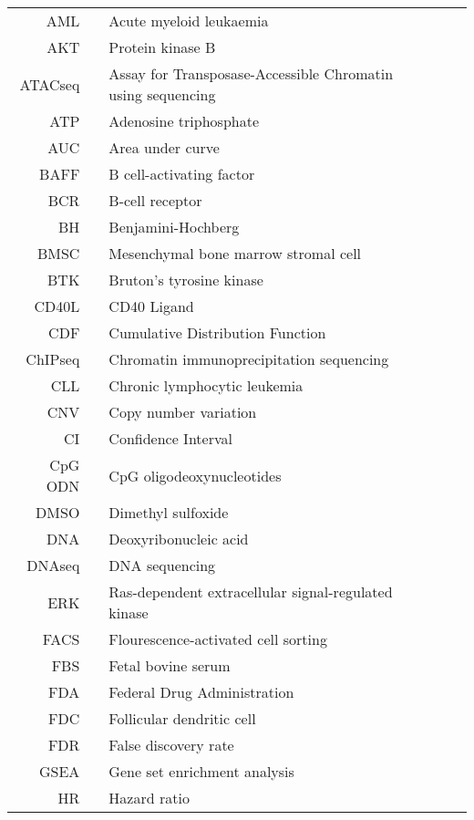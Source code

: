 \documentclass[11pt, a4paper, twosided]{book}
\begin{document}
\begin{tabular}{rp{0.2cm}lp{1cm}rp{0.2cm}l}
    AML & & Acute myeloid leukaemia \\
    AKT & & Protein kinase B \\
    ATACseq & & Assay for Transposase-Accessible Chromatin using sequencing \\
    ATP & & Adenosine triphosphate \\
    AUC & & Area under curve \\
    BAFF & & B cell-activating factor \\
    BCR & & B-cell receptor \\
    BH & & Benjamini-Hochberg \\
    BMSC & & Mesenchymal bone marrow stromal cell \\
    BTK & & Bruton’s tyrosine kinase \\
    CD40L & & CD40 Ligand \\
    CDF & & Cumulative Distribution Function \\
    ChIPseq & & Chromatin immunoprecipitation sequencing \\
    CLL & & Chronic lymphocytic leukemia \\
    CNV & & Copy number variation \\
    CI & & Confidence Interval \\
    CpG ODN & & CpG oligodeoxynucleotides \\
    DMSO & & Dimethyl sulfoxide  \\
    DNA & & Deoxyribonucleic acid  \\
    DNAseq & & DNA sequencing \\
    ERK & & Ras-dependent extracellular signal-regulated kinase \\
    FACS & & Flourescence-activated cell sorting \\
    FBS & & Fetal bovine serum \\
    FDA & & Federal Drug Administration \\
    FDC & & Follicular dendritic cell \\
    FDR & & False discovery rate \\
    GSEA & & Gene set enrichment analysis  \\
    HR & & Hazard ratio  \\
  
    
\end{tabular}
\newpage   
\end{document}
